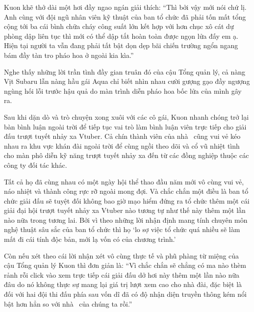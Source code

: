 \documentclass[../main.tex]{subfiles}
\begin{document}
Kuon khẽ thở dài một hơi đầy ngao ngán giải thích: ``Thì bởi vậy mới nói chứ lị. Anh cùng với đội ngũ nhân viên kỹ thuật của ban tổ chức đã phải tốn mất tổng cộng tới ba cái bình chữa cháy công suất lớn kết hợp với hơn chục xô cát dự phòng dập liên tục thì mới có thể dập tắt hoàn toàn được ngọn lửa đấy em ạ. Hiện tại người ta vẫn đang phải tất bật dọn dẹp bãi chiến trường ngổn ngang bám đầy tàn tro pháo hoa ở ngoài kia kìa.''

Nghe thấy những lời trần tình đầy gian truân đó của cậu Tổng quản lý, cả nàng Vịt Subaru lẫn nàng hầu gái Aqua chỉ biết nhìn nhau cười gượng gạo đầy ngượng ngùng hối lỗi trước hậu quả do màn trình diễn pháo hoa bốc lửa của mình gây ra.

Sau khi dặn dò và trò chuyện xong xuôi với các cô gái, Kuon nhanh chóng trở lại bàn bình luận ngoài trời để tiếp tục vai trò làm bình luận viên trực tiếp cho giải đấu trượt tuyết nhảy xa Vtuber. Cả chín thành viên của nhà \hll\ cũng vui vẻ kéo nhau ra khu vực khán đài ngoài trời để cùng ngồi theo dõi và cổ vũ nhiệt tình cho màn phô diễn kỹ năng trượt tuyết nhảy xa đến từ các đồng nghiệp thuộc các công ty đối tác khác.

Tất cả họ đã cùng nhau có một ngày hội thể thao đầu năm mới vô cùng vui vẻ, náo nhiệt và thành công rực rỡ ngoài mong đợi. Và chắc chắn một điều là ban tổ chức giải đấu sẽ tuyệt đối không bao giờ mạo hiểm đứng ra tổ chức thêm một cái giải đại hội trượt tuyết nhảy xa Vtuber nào tương tự như thế này thêm một lần nào nữa trong tương lai. Bởi vì theo những lời nhận định mang tính chuyên môn nghệ thuật sâu sắc của ban tổ chức thì họ `lo sợ việc tổ chức quá nhiều sẽ làm mất đi cái tính độc bản, mới lạ vốn có của chương trình.'

Còn nếu xét theo cái lời nhận xét vô cùng thực tế và phũ phàng từ miệng của cậu Tổng quản lý Kuon thì đơn giản là: ``Vì chắc chắn sẽ chẳng có ma nào thèm rảnh rỗi click vào xem trực tiếp cái giải đấu dở hơi này thêm một lần nào nữa đâu do nó không thực sự mang lại giá trị lượt xem cao cho nhà đài, đặc biệt là đối với hai đội thi đấu phía sau vốn dĩ đã có độ nhận diện truyền thông kém nổi bật hơn hẳn so với nhà \hll\ của chúng ta rồi.''

\newpage

\subsection*{\label{ep-003.II}}
\end{document}
